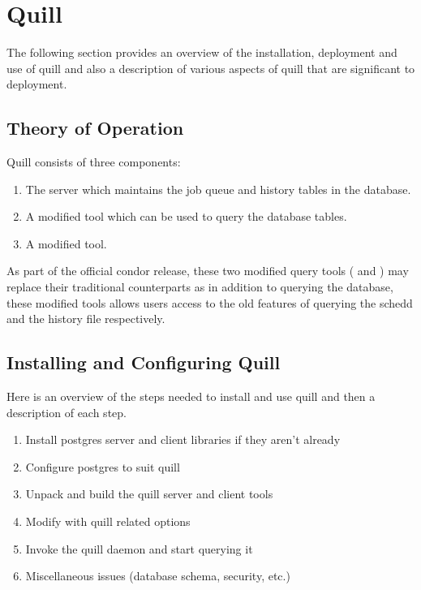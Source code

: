 \section{\label{sec:Quill}Quill}

The following section provides an overview of the installation, deployment
and use of quill and also a description of various aspects of quill that
are significant to deployment.

\subsection{\label{sec:Quill-TOE}Theory of Operation}
Quill consists of three components: 

\begin{enumerate}
\item The  server which maintains the job queue and history
tables in the database.

\item A modified  tool which can be used to query the database
tables.

\item A modified  tool.

\end{enumerate}

As part of the official condor release, these two modified query tools
( and ) may replace their traditional counterparts
as in addition to querying the database, these modified tools allows
users access to the old features of querying the schedd and the history
file respectively.

\subsection{\label{sec:Quill-Installation}Installing and Configuring Quill}

Here is an overview of the steps needed to install and use quill and then
a description of each step.

\begin{enumerate}
\item Install postgres server and client libraries if they aren't already
\item Configure postgres to suit quill
\item Unpack and build the quill server and client tools
\item Modify  with quill related options
\item Invoke the quill daemon and start querying it
\item Miscellaneous issues (database schema, security, etc.)
\end{enumerate}

